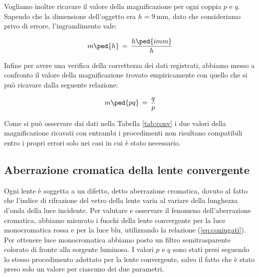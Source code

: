 Vogliamo inoltre ricavare il valore della magnificazione per ogni coppia $p$ e $q$.
Sapendo che la dimensione dell'oggetto era $h = \SI{9}{\milli\metre}$, dato che consideriamo privo di errore, l'ingrandimento vale: 

\begin{equation}
    m\ped{h} \,=\, \frac{h \ped{imm}}{h}
\end{equation}

Infine per avere una verifica della correttezza dei dati registrati, abbiamo messo a confronto il valore della magnificazione trovato empiricamente con quello che si può ricavare dalla seguente relazione:

\begin{equation}
    m\ped{pq} \,=\, \frac{q}{p}
\end{equation}



Come si può osservare dai dati nella Tabella \ref{tab:conv} i due valori della magnificazione ricavati con entrambi i procedimenti non risultano compatibili entro i propri errori solo nei casi in cui è stato necessario.

\subsection{Aberrazione cromatica della lente convergente}

Ogni lente è soggetta a un difetto, detto aberrazione cromatica, dovuto al fatto che l'indice di rifrazione del vetro della lente varia al variare della lunghezza d'onda della luce incidente.
Per valutare e osservare il fenomeno dell'aberrazione cromatica, abbiamo misurato i fuochi della lente convergente per la luce monocromatica rossa e per la luce blu, utilizzando la relazione (\ref{eq:coniugati}).
Per ottenere luce monocromatica abbiamo posto un filtro semitrasparente colorato di fronte alla sorgente luminosa. I valori $p$ e $q$ sono stati presi seguendo lo stesso procedimento adottato per la lente convergente, salvo il fatto che è stato preso solo un valore per ciascuno dei due parametri.

